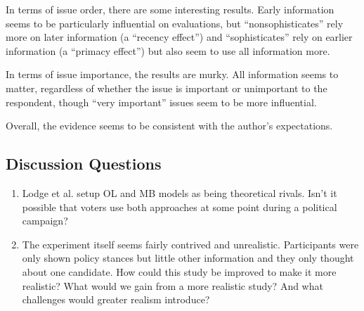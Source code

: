 \documentclass[a4paper]{exam}
\begin{document}
In terms of issue order, there are some interesting results. Early information seems to be particularly influential on evaluations, but ``nonsophisticates'' rely more on later information (a ``recency effect'') and ``sophisticates'' rely on earlier information (a ``primacy effect'') but also seem to use all information more.

In terms of issue importance, the results are murky. All information seems to matter, regardless of whether the issue is important or unimportant to the respondent, though ``very important'' issues seem to be more influential.

Overall, the evidence seems to be consistent with the author's expectations.

\subsection{Discussion Questions}

\begin{enumerate}
\item Lodge et al. setup OL and MB models as being theoretical rivals. Isn't it possible that voters use both approaches at some point during a political campaign?
\item The experiment itself seems fairly contrived and unrealistic. Participants were only shown policy stances but little other information and they only thought about one candidate. How could this study be improved to make it more realistic? What would we gain from a more realistic study? And what challenges would greater realism introduce?
\end{enumerate}
\end{document}
